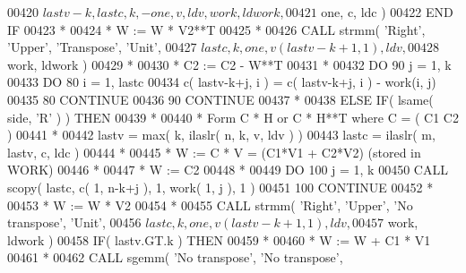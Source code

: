 \begin{DoxyCode}
00420      $                 lastv-k, lastc, k, -one, v, ldv, work, ldwork,
00421      $                 one, c, ldc )
00422 \textcolor{keywordflow}{               END IF}
00423 \textcolor{comment}{*}
00424 \textcolor{comment}{*              W := W * V2**T}
00425 \textcolor{comment}{*}
00426                \textcolor{keyword}{CALL }strmm( \textcolor{stringliteral}{'Right'}, \textcolor{stringliteral}{'Upper'}, \textcolor{stringliteral}{'Transpose'}, \textcolor{stringliteral}{'Unit'},
00427      $              lastc, k, one, v( lastv-k+1, 1 ), ldv,
00428      $              work, ldwork )
00429 \textcolor{comment}{*}
00430 \textcolor{comment}{*              C2 := C2 - W**T}
00431 \textcolor{comment}{*}
00432                \textcolor{keywordflow}{DO} 90 j = 1, k
00433                   \textcolor{keywordflow}{DO} 80 i = 1, lastc
00434                      c( lastv-k+j, i ) = c( lastv-k+j, i ) - work(i, j)
00435    80             \textcolor{keywordflow}{CONTINUE}
00436    90          \textcolor{keywordflow}{CONTINUE}
00437 \textcolor{comment}{*}
00438             \textcolor{keywordflow}{ELSE} \textcolor{keywordflow}{IF}( lsame( side, \textcolor{stringliteral}{'R'} ) ) \textcolor{keywordflow}{THEN}
00439 \textcolor{comment}{*}
00440 \textcolor{comment}{*              Form  C * H  or  C * H**T  where  C = ( C1  C2 )}
00441 \textcolor{comment}{*}
00442                lastv = max( k, ilaslr( n, k, v, ldv ) )
00443                lastc = ilaslr( m, lastv, c, ldc )
00444 \textcolor{comment}{*}
00445 \textcolor{comment}{*              W := C * V  =  (C1*V1 + C2*V2)  (stored in WORK)}
00446 \textcolor{comment}{*}
00447 \textcolor{comment}{*              W := C2}
00448 \textcolor{comment}{*}
00449                \textcolor{keywordflow}{DO} 100 j = 1, k
00450                   \textcolor{keyword}{CALL }scopy( lastc, c( 1, n-k+j ), 1, work( 1, j ), 1 )
00451   100          \textcolor{keywordflow}{CONTINUE}
00452 \textcolor{comment}{*}
00453 \textcolor{comment}{*              W := W * V2}
00454 \textcolor{comment}{*}
00455                \textcolor{keyword}{CALL }strmm( \textcolor{stringliteral}{'Right'}, \textcolor{stringliteral}{'Upper'}, \textcolor{stringliteral}{'No transpose'}, \textcolor{stringliteral}{'Unit'},
00456      $              lastc, k, one, v( lastv-k+1, 1 ), ldv,
00457      $              work, ldwork )
00458                \textcolor{keywordflow}{IF}( lastv.GT.k ) \textcolor{keywordflow}{THEN}
00459 \textcolor{comment}{*}
00460 \textcolor{comment}{*                 W := W + C1 * V1}
00461 \textcolor{comment}{*}
00462                   \textcolor{keyword}{CALL }sgemm( \textcolor{stringliteral}{'No transpose'}, \textcolor{stringliteral}{'No transpose'},

\end{DoxyCode}
